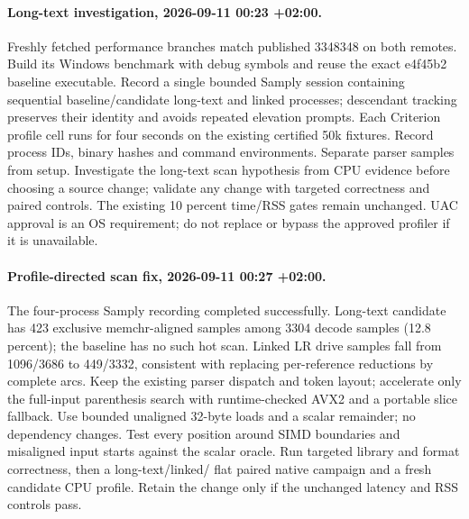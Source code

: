 \documentclass[11pt,a4paper]{article}
\begin{document}
\paragraph{Long-text investigation, 2026-09-11 00:23 +02:00.}
Freshly fetched performance branches match published 3348348 on both remotes.
Build its Windows benchmark with debug symbols and reuse the exact e4f45b2
baseline executable. Record a single bounded Samply session containing sequential
baseline/candidate long-text and linked processes; descendant tracking preserves
their identity and avoids repeated elevation prompts. Each Criterion profile cell
runs for four seconds on the existing certified 50k fixtures. Record process IDs,
binary hashes and command environments. Separate parser samples from setup.
Investigate the long-text scan hypothesis from CPU evidence before choosing a
source change; validate any change with targeted correctness and paired controls.
The existing 10 percent time/RSS gates remain unchanged. UAC approval is an OS
requirement; do not replace or bypass the approved profiler if it is unavailable.

\paragraph{Profile-directed scan fix, 2026-09-11 00:27 +02:00.}
The four-process Samply recording completed successfully. Long-text candidate
has 423 exclusive memchr-aligned samples among 3304 decode samples (12.8 percent);
the baseline has no such hot scan. Linked LR drive samples fall from 1096/3686 to
449/3332, consistent with replacing per-reference reductions by complete arcs.
Keep the existing parser dispatch and token layout; accelerate only the full-input
parenthesis search with runtime-checked AVX2 and a portable slice fallback.
Use bounded unaligned 32-byte loads and a scalar remainder; no dependency changes.
Test every position around SIMD boundaries and misaligned input starts against the
scalar oracle. Run targeted library and format correctness, then a long-text/linked/
flat paired native campaign and a fresh candidate CPU profile. Retain the change
only if the unchanged latency and RSS controls pass.
\end{document}

